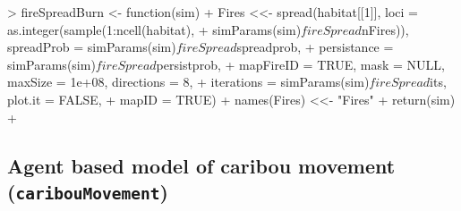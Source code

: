 \documentclass{article}
\begin{document}
\begin{Schunk}
\begin{Soutput}
> fireSpreadBurn <- function(sim) {
+     Fires <<- spread(habitat[[1]], loci = as.integer(sample(1:ncell(habitat), 
+         simParams(sim)$fireSpread$nFires)), spreadProb = simParams(sim)$fireSpread$spreadprob, 
+         persistance = simParams(sim)$fireSpread$persistprob, 
+         mapFireID = TRUE, mask = NULL, maxSize = 1e+08, directions = 8, 
+         iterations = simParams(sim)$fireSpread$its, plot.it = FALSE, 
+         mapID = TRUE)
+     names(Fires) <<- "Fires"
+     return(sim)
+ }
\end{Soutput}
\end{Schunk}

\newpage

\subsection{Agent based model of caribou movement (\texttt{caribouMovement})}
\end{document}
